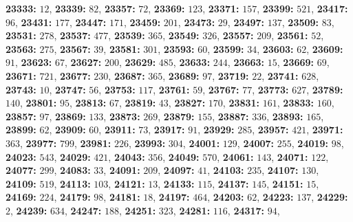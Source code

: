 \textsf{\bfseries 23333:} $12$, \textsf{\bfseries 23339:} $82$, \textsf{\bfseries 23357:} $72$, \textsf{\bfseries 23369:} $123$, \textsf{\bfseries 23371:} $157$, \textsf{\bfseries 23399:} $521$, \textsf{\bfseries 23417:} $96$, \textsf{\bfseries 23431:} $177$, \textsf{\bfseries 23447:} $171$, \textsf{\bfseries 23459:} $201$, \textsf{\bfseries 23473:} $29$, \textsf{\bfseries 23497:} $137$, \textsf{\bfseries 23509:} $83$, \textsf{\bfseries 23531:} $278$, \textsf{\bfseries 23537:} $477$, \textsf{\bfseries 23539:} $365$, \textsf{\bfseries 23549:} $326$, \textsf{\bfseries 23557:} $209$, \textsf{\bfseries 23561:} $52$, \textsf{\bfseries 23563:} $275$, \textsf{\bfseries 23567:} $39$, \textsf{\bfseries 23581:} $301$, \textsf{\bfseries 23593:} $60$, \textsf{\bfseries 23599:} $34$, \textsf{\bfseries 23603:} $62$, \textsf{\bfseries 23609:} $91$, \textsf{\bfseries 23623:} $67$, \textsf{\bfseries 23627:} $200$, \textsf{\bfseries 23629:} $485$, \textsf{\bfseries 23633:} $244$, \textsf{\bfseries 23663:} $15$, \textsf{\bfseries 23669:} $69$, \textsf{\bfseries 23671:} $721$, \textsf{\bfseries 23677:} $230$, \textsf{\bfseries 23687:} $365$, \textsf{\bfseries 23689:} $97$, \textsf{\bfseries 23719:} $22$, \textsf{\bfseries 23741:} $628$, \textsf{\bfseries 23743:} $10$, \textsf{\bfseries 23747:} $56$, \textsf{\bfseries 23753:} $117$, \textsf{\bfseries 23761:} $59$, \textsf{\bfseries 23767:} $77$, \textsf{\bfseries 23773:} $627$, \textsf{\bfseries 23789:} $140$, \textsf{\bfseries 23801:} $95$, \textsf{\bfseries 23813:} $67$, \textsf{\bfseries 23819:} $43$, \textsf{\bfseries 23827:} $170$, \textsf{\bfseries 23831:} $161$, \textsf{\bfseries 23833:} $160$, \textsf{\bfseries 23857:} $97$, \textsf{\bfseries 23869:} $133$, \textsf{\bfseries 23873:} $269$, \textsf{\bfseries 23879:} $155$, \textsf{\bfseries 23887:} $336$, \textsf{\bfseries 23893:} $165$, \textsf{\bfseries 23899:} $62$, \textsf{\bfseries 23909:} $60$, \textsf{\bfseries 23911:} $73$, \textsf{\bfseries 23917:} $91$, \textsf{\bfseries 23929:} $285$, \textsf{\bfseries 23957:} $421$, \textsf{\bfseries 23971:} $363$, \textsf{\bfseries 23977:} $799$, \textsf{\bfseries 23981:} $226$, \textsf{\bfseries 23993:} $304$, \textsf{\bfseries 24001:} $129$, \textsf{\bfseries 24007:} $255$, \textsf{\bfseries 24019:} $98$, \textsf{\bfseries 24023:} $543$, \textsf{\bfseries 24029:} $421$, \textsf{\bfseries 24043:} $356$, \textsf{\bfseries 24049:} $570$, \textsf{\bfseries 24061:} $143$, \textsf{\bfseries 24071:} $122$, \textsf{\bfseries 24077:} $299$, \textsf{\bfseries 24083:} $33$, \textsf{\bfseries 24091:} $209$, \textsf{\bfseries 24097:} $41$, \textsf{\bfseries 24103:} $235$, \textsf{\bfseries 24107:} $130$, \textsf{\bfseries 24109:} $519$, \textsf{\bfseries 24113:} $103$, \textsf{\bfseries 24121:} $13$, \textsf{\bfseries 24133:} $115$, \textsf{\bfseries 24137:} $145$, \textsf{\bfseries 24151:} $15$, \textsf{\bfseries 24169:} $224$, \textsf{\bfseries 24179:} $98$, \textsf{\bfseries 24181:} $18$, \textsf{\bfseries 24197:} $464$, \textsf{\bfseries 24203:} $62$, \textsf{\bfseries 24223:} $137$, \textsf{\bfseries 24229:} $2$, \textsf{\bfseries 24239:} $634$, \textsf{\bfseries 24247:} $188$, \textsf{\bfseries 24251:} $323$, \textsf{\bfseries 24281:} $116$, \textsf{\bfseries 24317:} $94$, 
